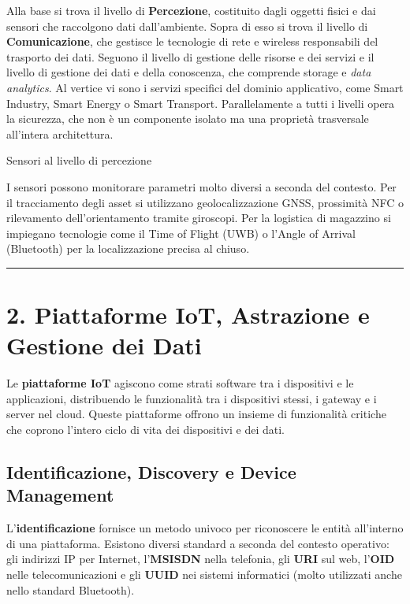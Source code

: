 \documentclass[
  italian,
  openany]{book}
\begin{document}
Alla base si trova il livello di \textbf{Percezione}, costituito dagli
oggetti fisici e dai sensori che raccolgono dati dall'ambiente. Sopra di
esso si trova il livello di \textbf{Comunicazione}, che gestisce le
tecnologie di rete e wireless responsabili del trasporto dei dati.
Seguono il livello di gestione delle risorse e dei servizi e il livello
di gestione dei dati e della conoscenza, che comprende storage e
\emph{data analytics}. Al vertice vi sono i servizi specifici del
dominio applicativo, come Smart Industry, Smart Energy o Smart
Transport. Parallelamente a tutti i livelli opera la sicurezza, che non
è un componente isolato ma una proprietà trasversale all'intera
architettura.

\begin{calloutnote}{Sensori al livello di percezione}

I sensori possono monitorare parametri molto diversi a seconda del
contesto. Per il tracciamento degli asset si utilizzano
geolocalizzazione GNSS, prossimità NFC o rilevamento dell'orientamento
tramite giroscopi. Per la logistica di magazzino si impiegano tecnologie
come il Time of Flight (UWB) o l'Angle of Arrival (Bluetooth) per la
localizzazione precisa al chiuso.

\end{calloutnote}

\begin{center}\rule{0.5\linewidth}{0.5pt}\end{center}

\section{2. Piattaforme IoT, Astrazione e Gestione dei
Dati}\label{piattaforme-iot-astrazione-e-gestione-dei-dati}

Le \textbf{piattaforme IoT} agiscono come strati software tra i
dispositivi e le applicazioni, distribuendo le funzionalità tra i
dispositivi stessi, i gateway e i server nel cloud. Queste piattaforme
offrono un insieme di funzionalità critiche che coprono l'intero ciclo
di vita dei dispositivi e dei dati.

\subsection{Identificazione, Discovery e Device
Management}\label{identificazione-discovery-e-device-management}

L'\textbf{identificazione} fornisce un metodo univoco per riconoscere le
entità all'interno di una piattaforma. Esistono diversi standard a
seconda del contesto operativo: gli indirizzi IP per Internet,
l'\textbf{MSISDN} nella telefonia, gli \textbf{URI} sul web,
l'\textbf{OID} nelle telecomunicazioni e gli \textbf{UUID} nei sistemi
informatici (molto utilizzati anche nello standard Bluetooth).
\end{document}
